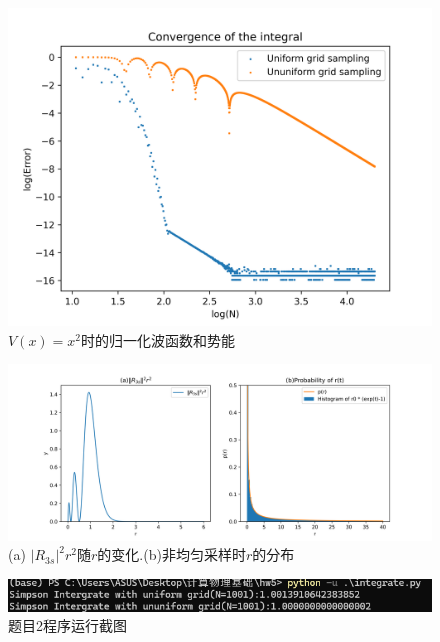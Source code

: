 \documentclass[11pt]{article}
\begin{document}
  \begin{figure}[ht]
    \centering
    \includegraphics[width=0.8\linewidth]{photo/integrate.png}
    \caption{$V(x)=x^2$时的归一化波函数和势能}
    \label{fig:int}
  \end{figure}

  \begin{figure}[ht]
    \centering
    \includegraphics[width=1.0\linewidth]{photo/R2.png}
    \caption{(a) $|R_{3s}|^2 r^2$随$r$的变化.(b)非均匀采样时$r$的分布}
    \label{fig:R2}
  \end{figure}

  \begin{figure}
    \centering
    \includegraphics[width=0.6\linewidth]{photo/figp2.png}
    \caption{题目2程序运行截图}
    \label{fig:p2}
  \end{figure}
\end{document}
